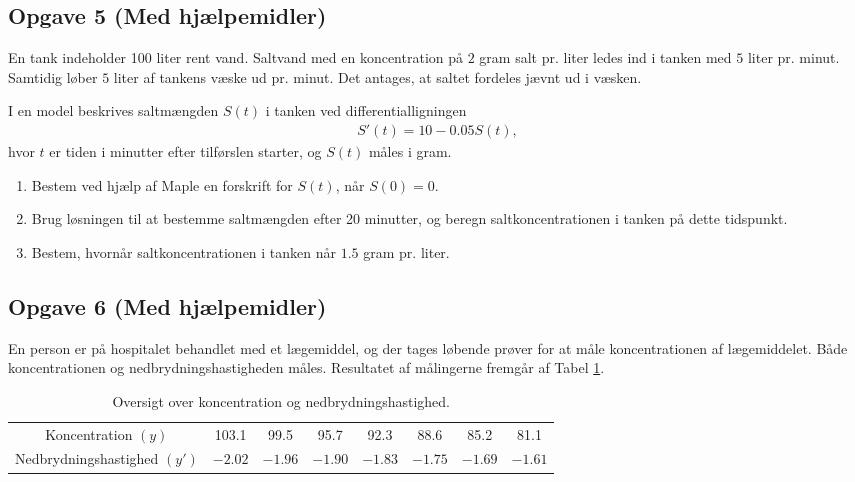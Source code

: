 \subsection*{Opgave 5 (Med hjælpemidler)}
En tank indeholder 100 liter rent vand. Saltvand med en koncentration på $2$ gram salt pr. liter ledes ind i tanken med $5$ liter pr. minut. Samtidig løber $5$ liter af tankens væske ud pr. minut. Det antages, at saltet fordeles jævnt ud i væsken. 

I en model beskrives saltmængden $S(t)$ i tanken ved differentialligningen
\begin{align*}
	S'(t) = 10-0.05S(t),
\end{align*}
hvor $t$ er tiden i minutter efter tilførslen starter, og $S(t)$ måles i gram.
\begin{enumerate}[label=\roman*)]
	\item Bestem ved hjælp af Maple en forskrift for $S(t)$, når $S(0)=0$.
	\item Brug løsningen til at bestemme saltmængden efter 20 minutter, og beregn saltkoncentrationen i tanken på dette tidspunkt.
	\item Bestem, hvornår saltkoncentrationen i tanken når $1.5$ gram pr. liter.
\end{enumerate}

\subsection*{Opgave 6 (Med hjælpemidler)}

En person er på hospitalet behandlet med et lægemiddel, og der tages løbende prøver for at måle koncentrationen af lægemiddelet. Både koncentrationen og nedbrydningshastigheden måles.  
Resultatet af målingerne fremgår af Tabel \ref{tab:medicin}. 
\begin{table}[H]
	\centering
	\begin{tabular}{cccccccc}
		Koncentration $(y)$ & 103.1 & 99.5 & 95.7 & 92.3 & 88.6 & 85.2 & 81.1 \\
		Nedbrydningshastighed $(y')$ & $-2.02$ & $-1.96$ & $-1.90$ & $-1.83$ & $-1.75$ & $-1.69$ & $-1.61$ 
	\end{tabular}
	\caption{Oversigt over koncentration og nedbrydningshastighed.}
	\label{tab:medicin}
\end{table}

